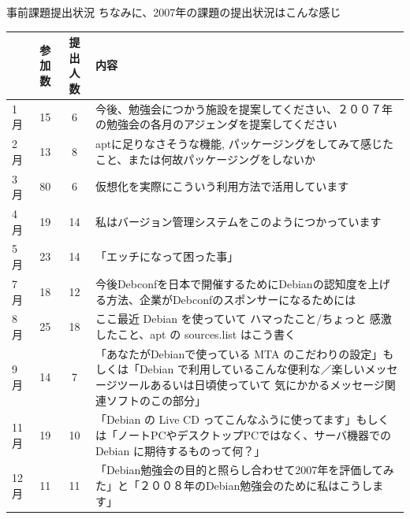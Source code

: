 \documentclass[cjk,dvipdfmx,12pt]{beamer}
\begin{document}


\begin{frame}{事前課題提出状況}
ちなみに、2007年の課題の提出状況はこんな感じ
{\scriptsize
\begin{table}[h]
 \begin{center}
  \begin{tabular}{|l|c|c|p{23em}|}
 \hline
 & 参加数 & 提出人数 & 内容\\
 \hline
1月 & 15 & 6 & 今後、勉強会につかう施設を提案してください、２００７年の勉強会の各月のアジェンダを提案してください\\
2月 & 13 & 8 & aptに足りなさそうな機能, パッケージングをしてみて感じたこと、または何故パッケージングをしないか\\
3月 & 80 & 6 & 仮想化を実際にこういう利用方法で活用しています\\
4月 & 19 & 14 & 私はバージョン管理システムをこのようにつかっています \\
5月 & 23 & 14 & 「エッチになって困った事」 \\
7月 & 18 & 12 & 今後Debconfを日本で開催するためにDebianの認知度を上げる方法、企業がDebconfのスポンサーになるためには \\
8月 & 25 & 18 & ここ最近 Debian を使っていて ハマったこと/ちょっと
	       感激したこと、apt の sources.list はこう書く\\
9月 & 14 & 7 & 「あなたがDebianで使っている MTA のこだわりの設定」もしくは「Debian
 で利用しているこんな便利な／楽しいメッセージツールあるいは日頃使っていて
 気にかかるメッセージ関連ソフトのこの部分」\\
11月 & 19 & 10 & 「Debian の Live CD ってこんなふうに使ってます」もしく
	   は「ノートPCやデスクトップPCではなく、サーバ機器での Debian
	   に期待するものって何？」\\
12月 & 11 & 11 & 「Debian勉強会の目的と照らし合わせて2007年を評価してみた」と「２００８年のDebian勉強会のために私はこうします」\\
 \hline
  \end{tabular}
 \end{center}
\end{table}
}

\end{frame}
\end{document}
